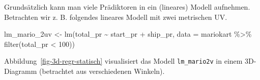 \documentclass[
  letterpaper,
  twoside,
  open=any]{scrbook}
\newenvironment{Shaded}{\begin{snugshade}}{\end{snugshade}}
\newcommand{\AttributeTok}[1]{\textcolor[rgb]{0.40,0.45,0.13}{#1}}
\newcommand{\DecValTok}[1]{\textcolor[rgb]{0.68,0.00,0.00}{#1}}
\newcommand{\FunctionTok}[1]{\textcolor[rgb]{0.28,0.35,0.67}{#1}}
\newcommand{\NormalTok}[1]{\textcolor[rgb]{0.00,0.23,0.31}{#1}}
\newcommand{\OtherTok}[1]{\textcolor[rgb]{0.00,0.23,0.31}{#1}}
\newcommand{\SpecialCharTok}[1]{\textcolor[rgb]{0.37,0.37,0.37}{#1}}
\theoremstyle{definition}
\theoremstyle{definition}
\theoremstyle{definition}
\theoremstyle{remark}
\begin{document}
Grundsätzlich kann man viele Prädiktoren in ein (lineares) Modell
aufnehmen. Betrachten wir z. B. folgendes lineares Modell mit zwei
metrischen UV.

\begin{Shaded}
\begin{Highlighting}[]
\NormalTok{lm\_mario\_2uv }\OtherTok{\textless{}{-}} \FunctionTok{lm}\NormalTok{(total\_pr }\SpecialCharTok{\textasciitilde{}}\NormalTok{ start\_pr }\SpecialCharTok{+}\NormalTok{ ship\_pr, }\AttributeTok{data =}\NormalTok{ mariokart }\SpecialCharTok{\%\textgreater{}\%} \FunctionTok{filter}\NormalTok{(total\_pr }\SpecialCharTok{\textless{}} \DecValTok{100}\NormalTok{))}
\end{Highlighting}
\end{Shaded}

Abbildung~\ref{fig-3d-regr-statisch} visualisiert das Modell
\texttt{lm\_mario2v} in einem 3D-Diagramm (betrachtet aus verschiedenen
Winkeln).
\end{document}
